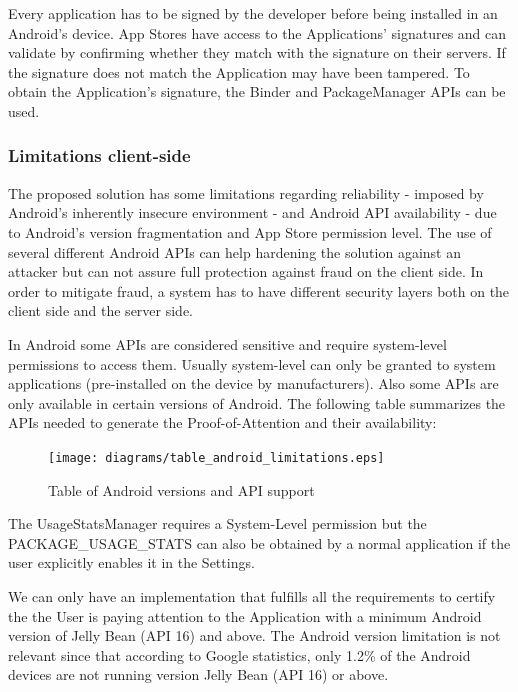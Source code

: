 Every application has to be signed by the developer before being installed in an Android's device. App Stores have access to the Applications' signatures and can validate by confirming whether they match with the signature on their servers. If the signature does not match the Application may have been tampered. To obtain the Application's signature, the Binder and PackageManager APIs can be used.

\subsubsection{Limitations client-side}

The proposed solution has some limitations regarding reliability - imposed by Android's inherently insecure environment - and Android API availability - due to Android's version fragmentation and App Store permission level. The use of several different Android APIs can help hardening the solution against an attacker but can not assure full protection against fraud on the client side. In order to mitigate fraud, a system has to have different security layers both on the client side and the server side. 

In Android some APIs are considered sensitive and require system-level permissions to access them. Usually system-level can only be granted to system applications (pre-installed on the device by manufacturers). Also some APIs are only available in certain versions of Android. The following table summarizes the APIs needed to generate the Proof-of-Attention and their availability:


\begin{figure}[!ht]
\centering
\texttt{[image: diagrams/table\_android\_limitations.eps]}
\caption{Table of Android versions and API support}
\label{fig:android_versions}
\end{figure}

The UsageStatsManager requires a System-Level permission but the PACKAGE\_USAGE\_STATS can also be obtained by a normal application if the user explicitly enables it in the Settings.

We can only have an implementation that fulfills all the requirements to certify the the User is paying attention to the Application with a minimum Android version of Jelly Bean (API 16) and above. The Android version limitation is not relevant since that according to Google statistics, only 1.2\% of the Android devices are not running version Jelly Bean (API 16) or above. %

